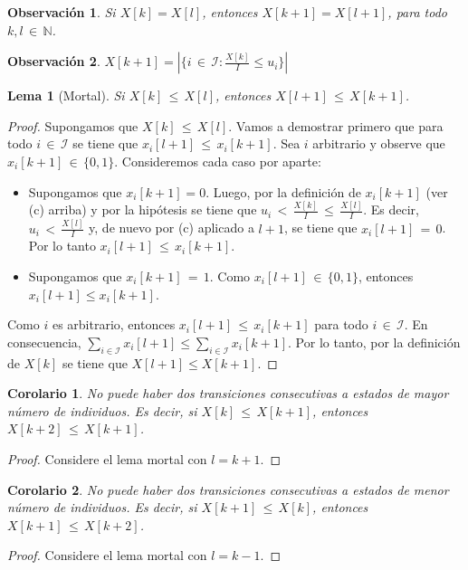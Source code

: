 \documentclass{article}
\newtheorem{coro}{Corolario}
\newtheorem{lema}{Lema}
\newtheorem{obs}{Observación}
\begin{document}
\begin{obs}
Si $X[k]=X[l]$, entonces $X[k{+}1]=X[l{+}1]$, para todo $k,l\,{\in}\,\mathbb{N}$.
\end{obs}

\begin{obs}
$X[k{+}1]=|\{i\,{\in}\,\mathcal{I}:\frac{X[k]}{I}\leq u_i\}|$
\end{obs}

\begin{lema}[Mortal]
Si $X[k]\,{\leq}\,X[l]$, entonces $X[l{+}1]\,{\leq}\,X[k{+}1]$.
\end{lema}

\begin{proof}
Supongamos que $X[k]\,{\leq}\,X[l]$. Vamos a demostrar primero que para todo $i\,{\in}\,\mathcal{I}$ se tiene que $x_i[l{+}1]\,{\leq}\, x_i[k{+}1]$. Sea $i$ arbitrario y observe que $x_i[k{+}1]\,{\in}\,\{0, 1\}$. Consideremos cada caso por aparte:
%
\begin{itemize}
\item Supongamos que $x_i[k{+}1]=0$. Luego, por la definición de $x_i[k{+}1]$ (ver (c) arriba) y por la hipótesis se tiene que $u_i\,{<}\,\frac{X[k]}{I}\,{\leq}\,\frac{X[l]}{I}$. Es decir, $u_i\,{<}\,\frac{X[l]}{I}$ y, de nuevo por (c) aplicado a $l{+}1$, se tiene que $x_i[l{+}1]\,{=}\,0$. Por lo tanto $x_i[l{+}1]\,{\leq}\,x_i[k{+}1]$.
\item Supongamos que $x_i[k{+}1]\,{=}\,1$. Como $x_i[l{+}1]\,{\in}\,\{0,1\}$, entonces $x_i[l{+}1]\leq x_i[k{+}1]$.
\end{itemize}
%
Como $i$ es arbitrario, entonces $x_i[l{+}1]\,{\leq}\, x_i[k{+}1]$ para todo $i\,{\in}\,\mathcal{I}$. En consecuencia, $\sum_{i\in\mathcal{I}} x_i[l{+}1]\leq \sum_{i\in\mathcal{I}} x_i[k{+}1]$. Por lo tanto, por la definición de $X[k]$ se tiene que $X[l{+}1]\leq X[k{+}1]$.
\end{proof}

\begin{coro}\label{lema1}
No puede haber dos transiciones consecutivas a estados de mayor número de individuos. Es decir, si $X[k]\,{\leq}\,X[k{+}1]$, entonces $X[k{+}2]\,{\leq}\, X[k{+}1]$.
\end{coro}
\begin{proof}
Considere el lema mortal con $l=k+1$.
\end{proof}

\begin{coro}\label{lema2}
No puede haber dos transiciones consecutivas a estados de menor número de individuos. Es decir, si $X[k{+}1]\,{\leq}\,X[k]$, entonces $X[k{+}1]\,{\leq}\, X[k{+}2]$.
\end{coro}
\begin{proof}
Considere el lema mortal con $l=k-1$.
\end{proof}
\end{document}
